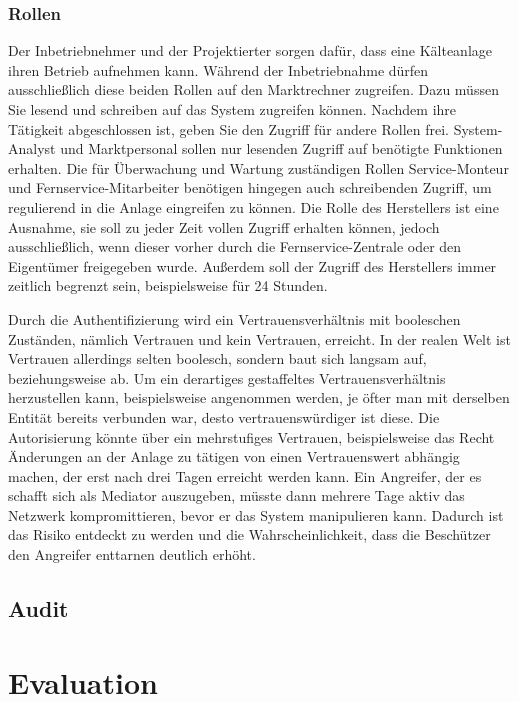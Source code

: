 \documentclass[11pt,a4paper]{report}
\begin{document}
\subsection{Rollen}

Der Inbetriebnehmer und der Projektierter sorgen dafür, dass eine Kälteanlage ihren Betrieb aufnehmen kann. Während der Inbetriebnahme dürfen ausschließlich diese beiden Rollen auf den Marktrechner zugreifen. Dazu müssen Sie lesend und schreiben auf das System zugreifen können. Nachdem ihre Tätigkeit abgeschlossen ist, geben Sie den Zugriff für andere Rollen frei. System-Analyst und Marktpersonal sollen nur lesenden Zugriff auf benötigte Funktionen erhalten. Die für Überwachung und Wartung zuständigen Rollen Service-Monteur und Fernservice-Mitarbeiter benötigen hingegen auch schreibenden Zugriff, um regulierend in die Anlage eingreifen zu können. Die Rolle des Herstellers ist eine Ausnahme, sie soll zu jeder Zeit vollen Zugriff erhalten können, jedoch ausschließlich, wenn dieser vorher durch die Fernservice-Zentrale oder den Eigentümer freigegeben wurde. Außerdem soll der Zugriff des Herstellers immer zeitlich begrenzt sein, beispielsweise für 24 Stunden.

Durch die Authentifizierung wird ein Vertrauensverhältnis mit booleschen Zuständen, nämlich Vertrauen und kein Vertrauen, erreicht. In der realen Welt ist Vertrauen allerdings selten boolesch, sondern baut sich langsam auf, beziehungsweise ab. Um ein derartiges gestaffeltes Vertrauensverhältnis herzustellen kann, beispielsweise angenommen werden, je öfter man mit derselben Entität bereits verbunden war, desto vertrauenswürdiger ist diese. Die Autorisierung könnte über ein mehrstufiges Vertrauen, beispielsweise das Recht Änderungen an der Anlage zu tätigen von einen Vertrauenswert abhängig machen, der erst nach drei Tagen erreicht werden kann. Ein Angreifer, der es schafft sich als Mediator auszugeben, müsste dann mehrere Tage aktiv das Netzwerk kompromittieren, bevor er das System manipulieren kann. Dadurch ist das Risiko entdeckt zu werden und die Wahrscheinlichkeit, dass die Beschützer den Angreifer enttarnen deutlich erhöht.

\section{Audit}



\chapter{Evaluation} \label{chap:evaluation}
\end{document}
